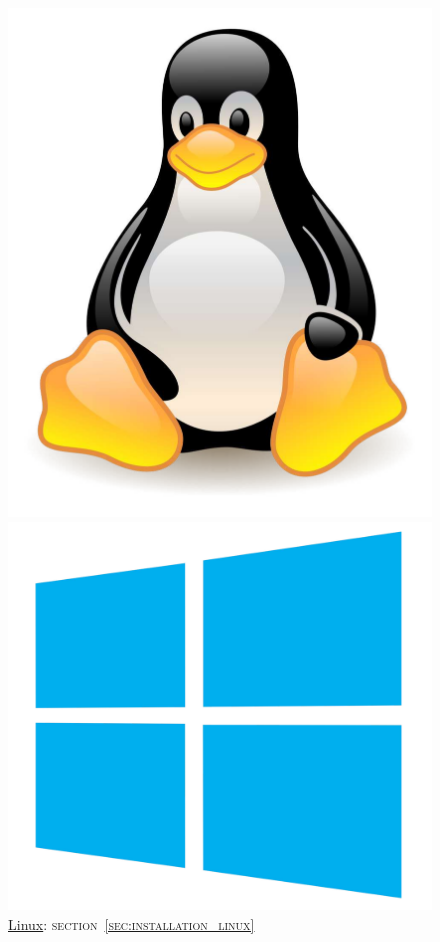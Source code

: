 \documentclass[internal]{nhitec_design}
\begin{document}
\begin{figure}[!h]
    \centering
    \begin{minipage}{0.32\textwidth}
        \centering
        \includegraphics[scale=0.05]{Images_formation/LinuxLogo.pdf}
        \caption*{\underline{Linux}: \textsc{section~\ref{sec:installation_linux}}}
    \end{minipage} 
    \begin{minipage}{0.32\textwidth}
        \centering
        \includegraphics[scale=0.025]{Images_formation/WindowsLogo.pdf}

\end{minipage}
\end{figure}
\end{document}

